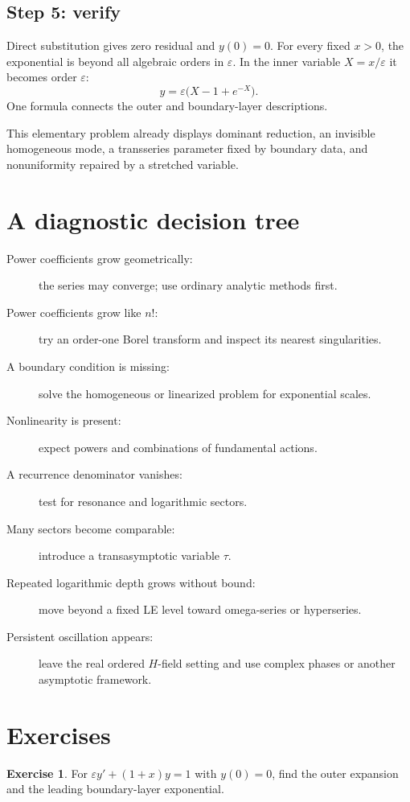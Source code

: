 \documentclass[11pt,openany]{book}
\theoremstyle{definition}
\newtheorem{exercise}{Exercise}[chapter]
\theoremstyle{plain}
\theoremstyle{remark}
\newcommand{\eps}{\varepsilon}
\begin{document}
\subsection*{Step 5: verify}
Direct substitution gives zero residual and $y(0)=0$. For every fixed $x>0$, the exponential is beyond all algebraic orders in $\eps$. In the inner variable $X=x/\eps$ it becomes order $\eps$:
\[
 y=\eps\bigl(X-1+e^{-X}\bigr).
\]
One formula connects the outer and boundary-layer descriptions.

This elementary problem already displays dominant reduction, an invisible homogeneous mode, a transseries parameter fixed by boundary data, and nonuniformity repaired by a stretched variable.

\section{A diagnostic decision tree}

\begin{description}
 \item[Power coefficients grow geometrically:] the series may converge; use ordinary analytic methods first.
 \item[Power coefficients grow like $n!$:] try an order-one Borel transform and inspect its nearest singularities.
 \item[A boundary condition is missing:] solve the homogeneous or linearized problem for exponential scales.
 \item[Nonlinearity is present:] expect powers and combinations of fundamental actions.
 \item[A recurrence denominator vanishes:] test for resonance and logarithmic sectors.
 \item[Many sectors become comparable:] introduce a transasymptotic variable $\tau$.
 \item[Repeated logarithmic depth grows without bound:] move beyond a fixed LE level toward omega-series or hyperseries.
 \item[Persistent oscillation appears:] leave the real ordered $H$-field setting and use complex phases or another asymptotic framework.
\end{description}

\section{Exercises}

\begin{exercise}
For $\eps y'+(1+x)y=1$ with $y(0)=0$, find the outer expansion and the leading boundary-layer exponential.
\end{exercise}
\end{document}

